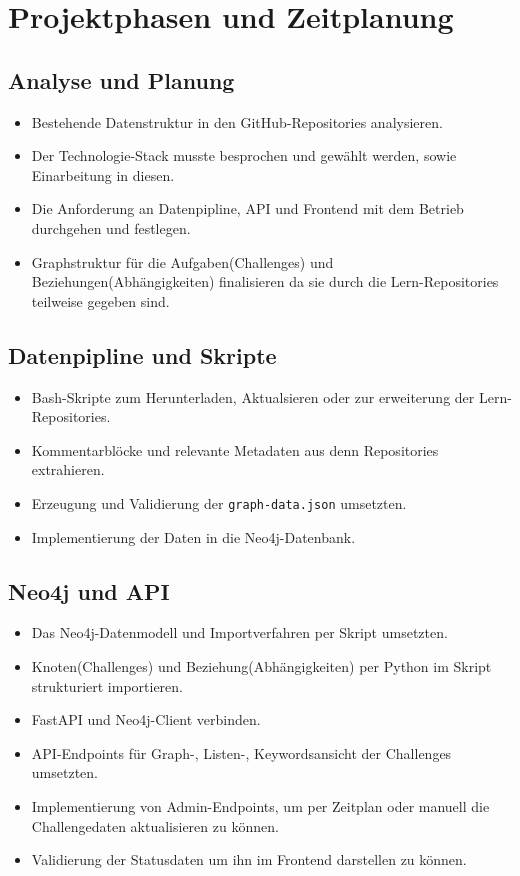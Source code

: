 \section{Projektphasen und Zeitplanung}

\subsection{Analyse und Planung}

\begin{itemize}[itemsep=0.4pt]
    \item Bestehende Datenstruktur in den GitHub-Repositories analysieren.
    \item Der Technologie-Stack musste besprochen und gewählt werden, sowie Einarbeitung in diesen.
    \item Die Anforderung an Datenpipline, API und Frontend mit dem Betrieb durchgehen und festlegen.
    \item Graphstruktur für die Aufgaben(Challenges) und Beziehungen(Abhängigkeiten) finalisieren da sie durch die Lern-Repositories teilweise gegeben sind.
\end{itemize}

\subsection{Datenpipline und Skripte}

\begin{itemize}[itemsep=0.4pt]
    \item Bash-Skripte zum Herunterladen, Aktualsieren oder zur erweiterung der Lern-Repositories.
    \item Kommentarblöcke und relevante Metadaten aus denn Repositories extrahieren.
    \item Erzeugung und Validierung der \texttt{graph-data.json} umsetzten.
    \item Implementierung der Daten in die Neo4j-Datenbank.
\end{itemize}

\subsection{Neo4j und API}

\begin{itemize}[itemsep=0.4pt]
    \item Das Neo4j-Datenmodell und Importverfahren per Skript umsetzten.
    \item Knoten(Challenges) und Beziehung(Abhängigkeiten) per Python im Skript strukturiert importieren.
    \item FastAPI und Neo4j-Client verbinden.
    \item API-Endpoints für Graph-, Listen-, Keywordsansicht der Challenges umsetzten.
    \item Implementierung von Admin-Endpoints, um per Zeitplan oder manuell die Challengedaten aktualisieren zu können.
    \item Validierung der Statusdaten um ihn im Frontend darstellen zu können.
\end{itemize}

